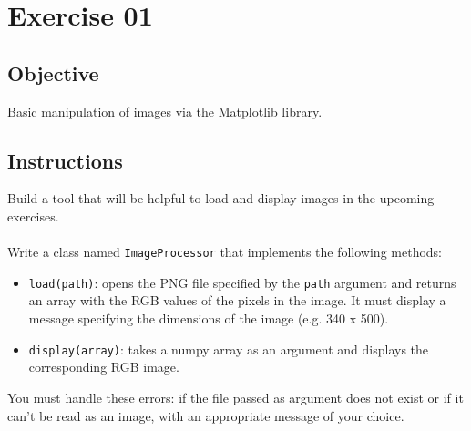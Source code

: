 \chapter{Exercise 01}
\makeheaderfilesforbidden


\section*{Objective}
Basic manipulation of images via the Matplotlib library.


\section*{Instructions}
Build a tool that will be helpful to load and display images in the upcoming exercises.\\
\\
Write a class named \texttt{ImageProcessor} that implements the following methods:
\begin{itemize}
  \item \texttt{load(path)}: opens the PNG file specified by the \texttt{path} argument and returns an array with the RGB values of the pixels in the image. It must display a message specifying the dimensions of the image (e.g. 340 x 500).

  \item \texttt{display(array)}: takes a numpy array as an argument and displays the corresponding RGB image.
\end{itemize}
You must handle these errors: if the file passed as argument does not exist or if it can't be read as an image, with an appropriate message of your choice.



